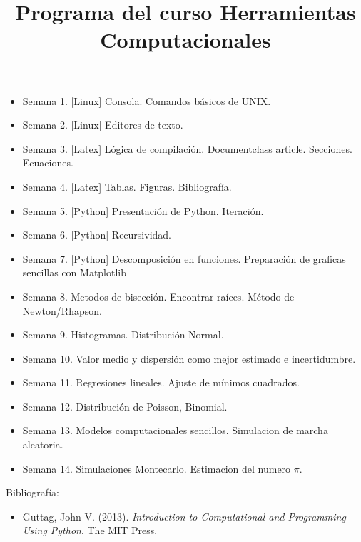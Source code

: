 \documentclass{article}
\title{Programa del curso Herramientas Computacionales}
\begin{document}
\maketitle
\begin{itemize}

\item Semana 1.
[Linux] Consola. Comandos b\'asicos de UNIX.

\item Semana 2.
[Linux] Editores de texto. 

\item Semana 3.
[Latex] L\'ogica de compilaci\'on. Documentclass article. Secciones. Ecuaciones.

\item Semana 4.
[Latex] Tablas. Figuras. Bibliograf\'ia.

\item Semana 5.
[Python] Presentaci\'on de Python. Iteraci\'on.

\item Semana 6.
[Python]  Recursividad.

\item Semana 7.
[Python] Descomposici\'on en funciones. Preparaci\'on de graficas sencillas con Matplotlib

\item Semana 8.
Metodos de bisecci\'on. Encontrar ra\'ices. M\'etodo de Newton/Rhapson. 

\item Semana 9.
Histogramas. Distribuci\'on Normal.

\item Semana 10.
Valor medio y dispersi\'on como mejor estimado e incertidumbre.

\item Semana 11.
Regresiones lineales. Ajuste de m\'inimos cuadrados.

\item Semana 12.
Distribuci\'on de Poisson, Binomial.

\item Semana 13.
Modelos computacionales sencillos. Simulacion de marcha aleatoria.

\item Semana 14.
Simulaciones Montecarlo.  Estimacion del numero $\pi$.

\end{itemize}

\begin{center}
{\Large Bibliograf\'ia}:
\end{center}\begin{itemize}
\item Guttag, John V. (2013). \textit{Introduction to Computational and Programming Using Python}, The MIT Press.
\end{itemize}
\end{document}
